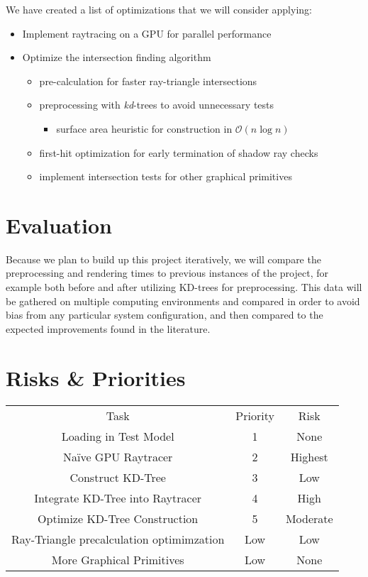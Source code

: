 \documentclass{article}
\begin{document}
We have created a list of optimizations that we will consider applying:
\begin{itemize}
\item Implement raytracing on a GPU for parallel performance
\item Optimize the intersection finding algorithm
    \begin{itemize}
    \item pre-calculation for faster ray-triangle intersections \cite{ray-triangle}
    \item preprocessing with \emph{kd}-trees to avoid unnecessary tests\cite{kd-nlogn}\cite{kd-bvh}
    \begin{itemize}
        \item surface area heuristic for construction in $\mathcal{O}(n\log n)$
    \end{itemize}
    \item first-hit optimization for early termination of shadow ray checks
    \item implement intersection tests for other graphical primitives
    \end{itemize}
\end{itemize}

\section*{Evaluation}
Because we plan to build up this project iteratively, we will compare the preprocessing and rendering times to previous instances of the project, for example both before and after utilizing KD-trees for preprocessing. This data will be gathered on multiple computing environments and compared in order to avoid bias from any particular system configuration, and then compared to the expected improvements found in the literature.

\section*{Risks \& Priorities}
\begin{center}\begin{tabu}{|c|c|c|}\everyrow{\hline}\hline
Task&Priority&Risk\\
Loading in Test Model&1&None\\
Naïve GPU Raytracer&2&Highest\\
Construct KD-Tree&3&Low\\
Integrate KD-Tree into Raytracer&4&High\\
Optimize KD-Tree Construction&5&Moderate\\
Ray-Triangle precalculation optimimzation&Low&Low\\
More Graphical Primitives&Low&None\\
\end{tabu}\end{center}
\end{document}
